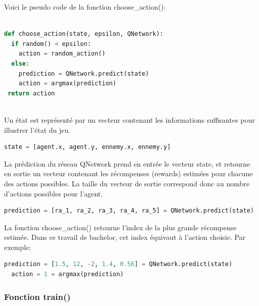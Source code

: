\documentclass[11pt,a4paper]{report}
\begin{document}
   \par Voici le pseudo code de la fonction choose\_action():  
  
  \begin{lstlisting}[language=python]
  
def choose_action(state, epsilon, QNetwork):
  if random() < epsilon:
    action = random_action()
  else:
    prediction = QNetwork.predict(state)
    action = argmax(prediction)
 return action
 
  \end{lstlisting} 
  
  \par Un état est représenté par un vecteur contenant les informations suffisantes pour illustrer l'état du jeu.
  \begin{lstlisting}[language=python]
  state = [agent.x, agent.y, ennemy.x, ennemy.y]
  \end{lstlisting} 
  
  \par La prédiction du réseau QNetwork prend en entrée le vecteur state, et retourne en sortie un vecteur contenant les récompenses (rewards) estimées pour chacune des actions possibles. La taille du vecteur de sortie correspond donc au nombre d'actions possibles pour l'agent. 
  
  \begin{lstlisting}[language=python]
  prediction = [ra_1, ra_2, ra_3, ra_4, ra_5] = QNetwork.predict(state)
  \end{lstlisting} 
  
  \par La fonction choose\_action() retourne l'index de la plus grande récompense estimée. Dans ce travail de bachelor, cet index équivaut à l'action choisie. Par exemple: 
  
 \begin{lstlisting}[language=python]
  prediction = [1.5, 12, -2, 1.4, 0.56] = QNetwork.predict(state)
  action = 1 = argmax(prediction)
  \end{lstlisting}
  
   \subsubsection{Fonction train()}
     
\end{document}

